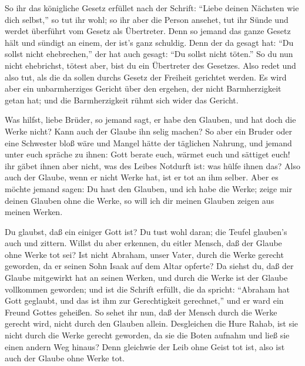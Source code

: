  So ihr das königliche Gesetz erfüllet nach der Schrift:
``Liebe deinen Nächsten wie dich selbst,'' so tut ihr wohl; 
so ihr aber die Person ansehet, tut ihr Sünde und werdet überführt vom
Gesetz als Übertreter.  Denn so jemand das ganze Gesetz
hält und sündigt an einem, der ist's ganz schuldig.  Denn
der da gesagt hat: ``Du sollst nicht ehebrechen,'' der hat auch gesagt:
``Du sollst nicht töten.'' So du nun nicht ehebrichst, tötest aber, bist
du ein Übertreter des Gesetzes.  Also redet und also tut,
als die da sollen durchs Gesetz der Freiheit gerichtet werden.
 Es wird aber ein unbarmherziges Gericht über den ergehen,
der nicht Barmherzigkeit getan hat; und die Barmherzigkeit rühmt sich
wider das Gericht.

 Was hilfst, liebe Brüder, so jemand sagt, er habe den
Glauben, und hat doch die Werke nicht? Kann auch der Glaube ihn selig
machen?  So aber ein Bruder oder eine Schwester bloß wäre
und Mangel hätte der täglichen Nahrung,  und jemand unter
euch spräche zu ihnen: Gott berate euch, wärmet euch und sättiget euch!
ihr gäbet ihnen aber nicht, was des Leibes Notdurft ist: was hülfe ihnen
das?  Also auch der Glaube, wenn er nicht Werke hat, ist er
tot an ihm selber.  Aber es möchte jemand sagen: Du hast
den Glauben, und ich habe die Werke; zeige mir deinen Glauben ohne die
Werke, so will ich dir meinen Glauben zeigen aus meinen Werken.

 Du glaubst, daß ein einiger Gott ist? Du tust wohl daran;
die Teufel glauben's auch und zittern.  Willst du aber
erkennen, du eitler Mensch, daß der Glaube ohne Werke tot sei?
 Ist nicht Abraham, unser Vater, durch die Werke gerecht
geworden, da er seinen Sohn Isaak auf dem Altar opferte? 
Da siehst du, daß der Glaube mitgewirkt hat an seinen Werken, und durch
die Werke ist der Glaube vollkommen geworden;  und ist die
Schrift erfüllt, die da spricht: ``Abraham hat Gott geglaubt, und das
ist ihm zur Gerechtigkeit gerechnet,'' und er ward ein Freund Gottes
geheißen.  So sehet ihr nun, daß der Mensch durch die Werke
gerecht wird, nicht durch den Glauben allein.  Desgleichen
die Hure Rahab, ist sie nicht durch die Werke gerecht geworden, da sie
die Boten aufnahm und ließ sie einen andern Weg hinaus? 
Denn gleichwie der Leib ohne Geist tot ist, also ist auch der Glaube
ohne Werke tot.

